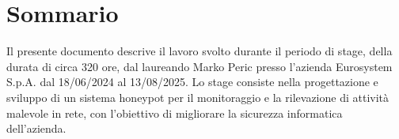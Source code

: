 \cleardoublepage
{}
{}
\begingroup
\let\clearpage\relax
\let\cleardoublepage\relax
\chapter*{Sommario}
Il presente documento descrive il lavoro svolto durante il periodo di stage, della durata di circa
320 ore, dal laureando Marko Peric presso l'azienda Eurosystem S.p.A. dal 18/06/2024 al
13/08/2025.
Lo stage consiste nella progettazione e sviluppo di un sistema honeypot per il monitoraggio e la
rilevazione di attività malevole in rete, con l'obiettivo di migliorare la sicurezza informatica
dell'azienda.

\endgroup
\vfill
